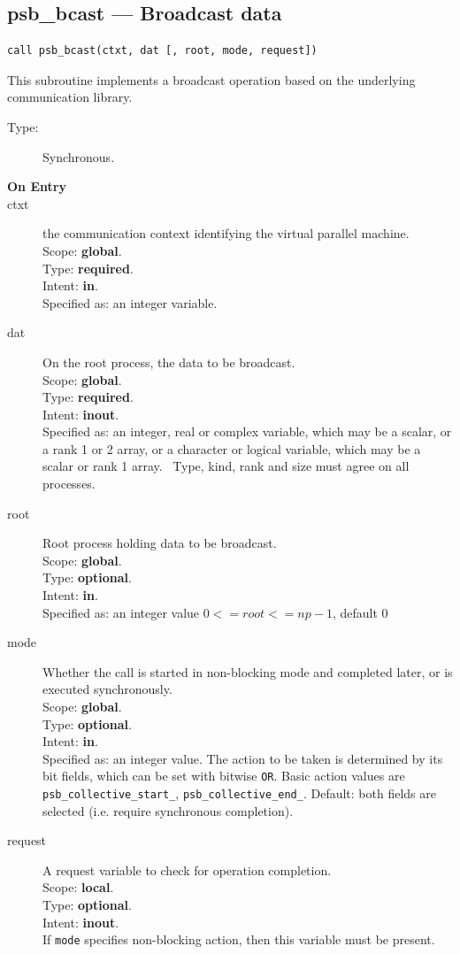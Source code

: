 \clearpage\subsection{psb\_bcast --- Broadcast data}

\begin{verbatim}
call psb_bcast(ctxt, dat [, root, mode, request])
\end{verbatim}

This subroutine implements a broadcast operation based on the
underlying communication library. 
\begin{description}
\item[Type:] Synchronous.
\item[\bf  On Entry ]
\item[ctxt] the communication context identifying the virtual
  parallel machine.\\
Scope: {\bf global}.\\
Type: {\bf required}.\\
Intent: {\bf in}.\\
Specified as: an integer variable.
\item[dat] On the root process, the data to be broadcast.\\
Scope: {\bf global}.\\
Type: {\bf required}.\\
Intent: {\bf inout}.\\
Specified as: an integer, real or complex variable, which may be a
scalar, or a rank 1 or 2 array, or a character or logical variable,
which may be a scalar or rank 1 array. \
Type, kind, rank and size must agree on all processes.
\item[root] Root process holding data to be broadcast.\\
Scope: {\bf global}.\\
Type: {\bf optional}.\\
Intent: {\bf in}.\\
Specified as: an integer value $0<= root <= np-1$, default 0 \
\item[mode] Whether the call is started in non-blocking mode and completed
  later, or is executed synchronously.\\
Scope: {\bf global}.\\
Type: {\bf optional}.\\
Intent: {\bf in}.\\
Specified as: an integer value. The action to be taken is determined
by its bit fields, which can be set with bitwise \verb|OR|. Basic
action values are \verb|psb_collective_start_|, \verb|psb_collective_end_|.
Default:  both fields are selected (i.e. require synchronous completion).\\
\item[request] A request variable to check for operation completion.\\
Scope: {\bf local}.\\
Type: {\bf optional}.\\
Intent: {\bf inout}.\\
If \verb|mode| specifies non-blocking action, then this
variable must be present.
\end{description}


